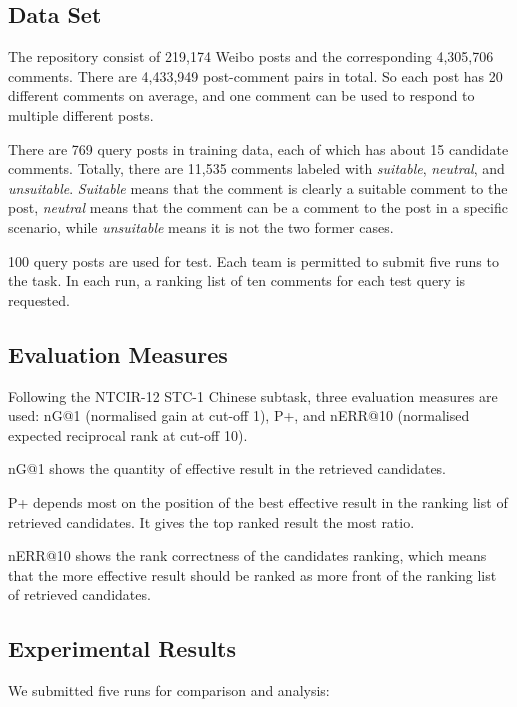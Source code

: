\documentclass{sig-alternate}
\begin{document}
\subsection{Data Set}
The repository consist of 219,174 Weibo posts and the
corresponding 4,305,706 comments. There are 4,433,949 post-comment
pairs in total. So each post has 20 different comments on
average, and one comment can be used to respond to multiple
different posts. 

There are 769 query posts in training data, each of which has about 15 
candidate comments. Totally, there are 11,535 comments labeled with 
\emph{suitable}, \emph{neutral}, and \emph{unsuitable}. \emph{Suitable} means that the comment 
is clearly a suitable comment to the post, \emph{neutral} means that the comment 
can be a comment to the post in a specific scenario, while \emph{unsuitable} means 
it is not the two former cases. 

100 query posts are used for test. Each team is permitted to submit five
runs to the task. In each run, a ranking list of ten comments for
each test query is requested. 

\subsection{Evaluation Measures}
Following the NTCIR-12 STC-1 Chinese subtask, three evaluation measures are
used: nG@1 (normalised gain at cut-off 1), P+, and nERR@10 (normalised expected reciprocal rank at cut-off 10)\cite{Lifeng}\cite{Lifeng-13}.

nG@1 shows the quantity of effective result in the retrieved candidates. 

P+ depends most on the position of the best effective result in the
ranking list of retrieved candidates. It gives the top ranked result
the most ratio. 

nERR@10 shows the rank correctness of the candidates ranking,
which means that the more effective result should be ranked as
more front of the ranking list of retrieved candidates.

\subsection{Experimental Results}
We submitted five runs for comparison and analysis:
\end{document}
